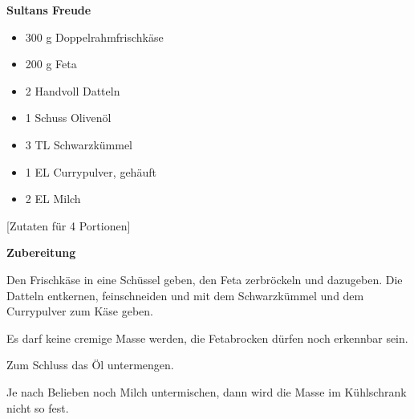 

\parindent0pt	

\pagestyle{empty}


\textbf{{\LARGE Sultans Freude}}%

\hrulefill
\vspace*{\fill}
\begin{multicols}{2}	


\begin{itemize}
\item 300 g Doppelrahmfrischkäse
\item 200 g Feta
\item 2 Handvoll Datteln
\item 1 Schuss Olivenöl
\item 3 TL Schwarzkümmel
\item 1 EL Currypulver, gehäuft
\item 2 EL Milch
\end{itemize}
\end{multicols}
\vfill									%

\vspace{2cm}
%
\begin{center}
%
[Zutaten für 4 Portionen]%
\end{center}


\vfill
\newpage
\textbf{{\LARGE Zubereitung}}%

\hrulefill

\vspace*{\fill}
\begin{multicols}{2}


Den Frischkäse in eine Schüssel geben, den Feta zerbröckeln und dazugeben.\newline
Die Datteln entkernen, feinschneiden und mit dem Schwarzkümmel und dem Currypulver zum
Käse geben.\newline 

Es darf keine cremige Masse werden, die Fetabrocken dürfen noch erkennbar sein.\newline

Zum Schluss das Öl untermengen.\newline

Je nach Belieben noch Milch untermischen, dann wird die Masse im Kühlschrank nicht so fest.

\end{multicols}
\vfill
